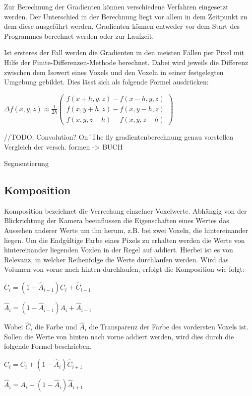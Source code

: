 Zur Berechnung der Gradienten können verschiedene Verfahren eingesetzt werden. Der Unterschied in der Berechnung liegt vor allem in dem Zeitpunkt zu dem diese ausgeführt werden. Gradienten können entweder vor dem Start des Programmes berechnet werden oder zur Laufzeit. 

Ist ersteres der Fall werden die Gradienten in den meisten Fällen per Pixel mit Hilfe der Finite-Differenzen-Methode berechnet. 
Dabei wird jeweils die Differenz zwischen dem Isowert eines Voxels und den Voxeln in seiner festgelegten Umgebung gebildet. Dies lässt sich als folgende Formel ausdrücken: 

$
\Delta f(x,y,z)\approx \frac{1}{2h}
\left ( \begin{matrix}
f(x + h, y, z) - f(x - h, y, z)\\ 
f(x, y + h, z) - f(x, y - h, z)\\ 
f(x, y, z + h) - f(x, y, z - h)
\end{matrix} \right )
$

//TODO:
Convolution?
On´The fly gradientenberechnung
genau vorstellen
Vergleich der versch. formen -> BUCH

Segmentierung

\subsection{Komposition}

Komposition bezeichnet die Verrechung einzelner Voxelwerte. Abhängig von der Blickrichtung der Kamera beeinflussen die Eigenschaften eines Wertes das Aussehen anderer Werte um ihn herum, z.B. bei zwei Voxeln, die hintereinander liegen. Um die Endgültige Farbe eines Pixels zu erhalten werden die Werte von hintereinander liegenden Voxlen in der Regel auf addiert. Hierbei ist es von Relevanz, in welcher Reihenfolge die Werte durchlaufen werden. Wird das Volumen von vorne nach hinten durchlaufen, erfolgt die Komposition wie folgt:

$\hat{C}_{i}=(1-\hat{A}_{i-1})C_{i}+\hat{C}_{i-1}$

$\hat{A}_{i}=(1-\hat{A}_{i-1})A_{i}+\hat{A}_{i-1}$

Wobei $\hat{C}_{i}$ die Farbe und $\hat{A}_{i}$ die Transparenz der Farbe des vordersten Voxels ist.
Sollen die Werte von hinten nach vorne addiert werden, wird dies durch die folgende Formel beschrieben.

$\hat{C}_{i}=C_{i}+(1-\hat{A}_{i})\hat{C}_{i+1}$

$\hat{A}_{i}=A_{i}+(1-\hat{A}_{i})\hat{A}_{i+1}$

